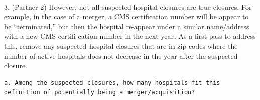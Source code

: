 \documentclass[
  letterpaper,
  DIV=11,
  numbers=noendperiod]{scrartcl}
\makeatletter
\let\oldparagraph\paragraph
\renewcommand{\paragraph}{
    \@ifstar
      \xxxParagraphStar
      \xxxParagraphNoStar
  }
\newcommand{\xxxParagraphStar}[1]{\oldparagraph*{#1}\mbox{}}
\newcommand{\xxxParagraphNoStar}[1]{\oldparagraph{#1}\mbox{}}
\makeatother
\begin{document}
\paragraph{3. (Partner 2) However, not all suspected hospital closures
are true closures. For example, in the case of a merger, a CMS
certification number will be appear to be ``terminated,'' but then the
hospital re-appear under a similar name/address with a new CMS certifi
cation number in the next year. As a first pass to address this, remove
any suspected hospital closures that are in zip codes where the number
of active hospitals does not decrease in the year after the suspected
closure.}\label{partner-2-however-not-all-suspected-hospital-closures-are-true-closures.-for-example-in-the-case-of-a-merger-a-cms-certification-number-will-be-appear-to-be-terminated-but-then-the-hospital-re-appear-under-a-similar-nameaddress-with-a-new-cms-certifi-cation-number-in-the-next-year.-as-a-first-pass-to-address-this-remove-any-suspected-hospital-closures-that-are-in-zip-codes-where-the-number-of-active-hospitals-does-not-decrease-in-the-year-after-the-suspected-closure.}

\begin{verbatim}
a. Among the suspected closures, how many hospitals fit this definition of potentially being a merger/acquisition?
\end{verbatim}
\end{document}
